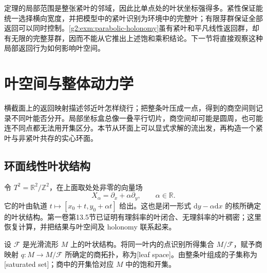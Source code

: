定理的局部范围是整张紧叶的邻域，因此比单点处的叶状坐标强得多。紧性保证能统一选择横向宽度，并把模型中的紧叶识别为环境中的完整叶；有限芽群保证全部返回可以同时控制。\cref{g2:exm:parabolic-holonomy}虽有紧叶和平凡线性返回群，却有无限的完整芽群，因而不能从它推出上述饱和乘积结论。下一节将直接观察这种局部返回行为如何影响叶空间。

\section{叶空间与整体动力学}
\label{g2:sec:D02}

横截面上的返回映射描述邻近叶怎样绕行；把整条叶压成一点，得到的商空间则记录不同叶能否分开。局部坐标盒总像一叠平行切片，商空间却可能是圆周，也可能连不同点都无法用开集区分。本节从环面上可以显式求解的流出发，再构造一个紧叶与非紧叶共存的实心环面。

\subsection{环面线性叶状结构}
\label{g2:subsec:D02:01}

令 \(T^2=\mathbb R^2/\mathbb Z^2\)，在上面取处处非零的向量场
\[
	X_\alpha=\partial_x+\alpha\partial_y,\qquad \alpha\in\mathbb R.
\]
它的叶由轨道 \(t\mapsto[x_0+t,y_0+\alpha t]\) 给出。这也是闭一形式 \(\mathrm dy-\alpha\mathrm dx\) 的核所确定的叶状结构。第一卷第13.5节已证明有理斜率的叶闭合、无理斜率的叶稠密；这里恢复计算，并把结果与叶空间及 holonomy 联系起来。

\begin{definition}\label{g2:def:foliation-leaf-space}
	设 \(\mathcal F\) 是光滑流形 \(M\) 上的叶状结构。将同一叶内的点识别所得集合 \(M/\mathcal F\)，赋予商映射 \(q:M\to M/\mathcal F\) 所确定的商拓扑，称为[leaf space]。由整条叶组成的子集称为[saturated set]；商中的开集恰对应 \(M\) 中的饱和开集。
\end{definition}

